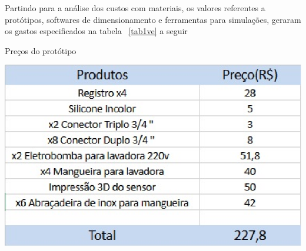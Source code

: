 Partindo para a análise dos custos com materiais, os valores referentes a protótipos, softwares de dimensionamento e ferramentas para simulações, geraram os gastos especificados na tabela ~\ref{tab1ve} a seguir 
\begin{table}[!htb]
	\centering
	\caption{Preços do protótipo}\label{tab1ve}
	\includegraphics[scale=1]{figuras/figura1ve.eps}
\end{table} 

